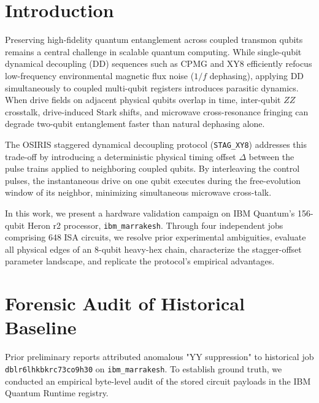 \documentclass[twocolumn,aps,pra,superscriptaddress,showpacs,floatfix]{revtex4-2}
\begin{document}
\maketitle

\section{Introduction}

Preserving high-fidelity quantum entanglement across coupled transmon qubits remains a central challenge in scalable quantum computing. While single-qubit dynamical decoupling (DD) sequences such as CPMG and XY8 efficiently refocus low-frequency environmental magnetic flux noise ($1/f$ dephasing), applying DD simultaneously to coupled multi-qubit registers introduces parasitic dynamics. When drive fields on adjacent physical qubits overlap in time, inter-qubit $ZZ$ crosstalk, drive-induced Stark shifts, and microwave cross-resonance fringing can degrade two-qubit entanglement faster than natural dephasing alone.

The OSIRIS staggered dynamical decoupling protocol (\texttt{STAG\_XY8}) addresses this trade-off by introducing a deterministic physical timing offset $\Delta$ between the pulse trains applied to neighboring coupled qubits. By interleaving the control pulses, the instantaneous drive on one qubit executes during the free-evolution window of its neighbor, minimizing simultaneous microwave cross-talk.

In this work, we present a hardware validation campaign on IBM Quantum's 156-qubit Heron r2 processor, \texttt{ibm\_marrakesh}. Through four independent jobs comprising 648 ISA circuits, we resolve prior experimental ambiguities, evaluate all physical edges of an 8-qubit heavy-hex chain, characterize the stagger-offset parameter landscape, and replicate the protocol's empirical advantages.

\section{Forensic Audit of Historical Baseline}

Prior preliminary reports attributed anomalous "YY suppression" to historical job \texttt{dblr6lhkbkrc73co9h30} on \texttt{ibm\_marrakesh}. To establish ground truth, we conducted an empirical byte-level audit of the stored circuit payloads in the IBM Quantum Runtime registry.
\end{document}
